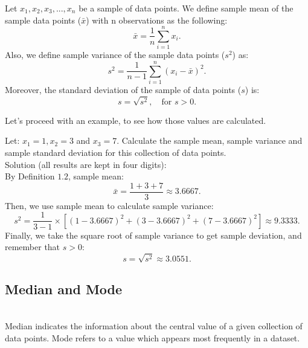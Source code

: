 \begin{definition}
	Let $x_1, x_2, x_3, ..., x_n$ be a sample of data points. We define sample mean of the sample data points ($\bar{x}$) with n observations as the following: 
	$$ \bar{x} = \frac{1}{n} \sum_{i=1}^{n} x_i. $$
	Also, we define sample variance of the sample data points ($s^2$) as: \[ s^2 = \frac{1}{n-1} \sum_{i=1}^{n}(x_i - \bar{x})^2.\] Moreover, the standard deviation of the sample of data points ($s$) is: \[ s = \sqrt{s^2}, \quad \text{for } s > 0.\]
\end{definition}

Let's proceed with an example, to see how those values are calculated.

\begin{example}
Let: $x_1 = 1, x_2 = 3$ and $x_3 = 7$. Calculate the sample mean, sample variance and sample standard deviation for this collection of data points.\\

Solution (all results are kept in four digits):\\
\noindent
By Definition $1.2$, sample mean: \[ \bar{x} = \frac{1+3+7}{3} \approx 3.6667.\]
Then, we use sample mean to calculate sample variance: \[ s^2 = \frac{1}{3-1} \times [(1-3.6667)^2+(3-3.6667)^2+(7-3.6667)^2] \approx 9.3333.\]
Finally, we take the square root of sample variance to get sample deviation, and remember that $s > 0$: \[ s = \sqrt{s^2} \approx 3.0551.\]
\end{example}

\subsection{Median and Mode}\\

\noindent
Median indicates the information about the central value of a given collection of data points. Mode refers to a value which appears most frequently in a dataset.\\

